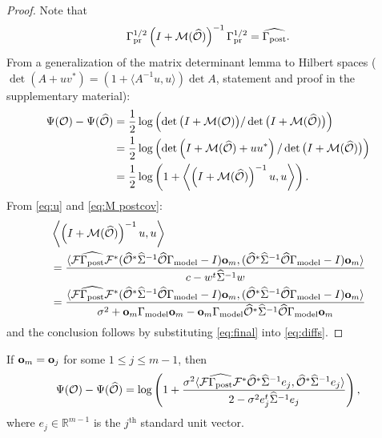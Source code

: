 \begin{proof}
  Note that
  \begin{equation}\label{eq:M postcov}
    \Gamma_{\textup{pr}}^{1/2} \left (I + \mathcal{M}( \widehat{\mathcal{O}} ) \right )^{-1} \Gamma_{\textup{pr}}^{1/2} = \widehat{\Gamma_{\textup{post}}}.
  \end{equation}
  From a generalization of the matrix determinant lemma to Hilbert
  spaces ($\det(A + uv^*) = (1 + \langle A^{-1} u,u \rangle) \det
  A$, statement and proof in the supplementary material):
  \begin{align}\label{eq:diffs}
    \begin{split}
      \Psi( \mathcal{O} ) - \Psi( \widehat{\mathcal{O}} )
      &= \frac12 \log \left (\det \big ( I + \mathcal{M} ( \mathcal{O} ) \big ) / \det \big ( I + \mathcal{M} (\widehat{\mathcal{O}}) \big ) \right )\\
      &= \frac12  \log \left (\det \left ( I + \mathcal{M}(\widehat{\mathcal{O}}) + uu^* \right ) / \det \big ( I + \mathcal{M} (\widehat{\mathcal{O}}) \big )\right ) \\
      &= \frac12 \log \left ( 1 + \left \langle \left ( I+\mathcal{M}(\widehat{\mathcal{O}}) \right )^{-1} u, u  \right \rangle \right ).
    \end{split}
  \end{align}
  From \eqref{eq:u} and \eqref{eq:M postcov}:
  \begin{align}\label{eq:final}
    \begin{split}
      &\left \langle \left (I+\mathcal{M} (\widehat{\mathcal{O}})\right )^{-1}u, u \right \rangle\\
      &= \frac{
        \langle \mathcal{F} \widehat{\Gamma_{\textup{post}}} \mathcal{F}^* (\widehat{\mathcal{O}}^* \widehat{\Sigma}^{-1} \widehat{\mathcal{O}} \Gamma_{\textup{model}} - I ) \mathbf{o}_m,
        (\widehat{\mathcal{O}}^* \widehat{\Sigma}^{-1} \widehat{\mathcal{O}} \Gamma_{\textup{model}} - I ) \mathbf{o}_m \rangle
      }{
        c- w^t \widehat{\Sigma}^{-1} w
      }\\
      &= 
      \frac{
      \langle \mathcal{F} \widehat{\Gamma_{\textup{post}}} \mathcal{F}^* (\widehat{\mathcal{O}}^* \widehat{\Sigma}^{-1} \widehat{\mathcal{O}} \Gamma_{\textup{model}} - I ) \mathbf{o}_m,
      (\widehat{\mathcal{O}}^* \widehat{\Sigma}^{-1} \widehat{\mathcal{O}} \Gamma_{\textup{model}} - I ) \mathbf{o}_m \rangle
      }{
        \sigma^2 + \mathbf{o}_m \Gamma_{\textup{model}} \mathbf{o}_m - \mathbf{o}_m \Gamma_{\textup{model}} \widehat{\mathcal{O}}^* \widehat{\Sigma}^{-1} \widehat{\mathcal{O}} \Gamma_{\textup{model}} \mathbf{o}_m 
      }
    \end{split}
  \end{align}
  and the conclusion follows by substituting \eqref{eq:final} into
  \eqref{eq:diffs}.
\end{proof}



\begin{corollary}\label{cor:same meas}
  If $\mathbf{o}_m = \mathbf{o}_j$ for some $1 \leq j \leq m-1$, then
  \begin{equation*}
    \Psi(\mathcal{O}) - \Psi(\widehat{\mathcal{O}}) =
    \log \left ( 1 + \frac{\sigma^2
      \langle \mathcal{F} \widehat{\Gamma_{\textup{post}}} \mathcal{F}^* \widehat{\mathcal{O}}^* \widehat{\Sigma}^{-1} e_j,
      \widehat{\mathcal{O}}^* \widehat{\Sigma}^{-1}e_j \rangle
    }{
      2 - \sigma^2 e_j^t\widehat{\Sigma}^{-1}e_j 
    }       
    \right ),
  \end{equation*}
  where $e_j\in \mathbb{R}^{m-1}$ is the $j^{\text{th}}$ standard unit
  vector.
\end{corollary}

